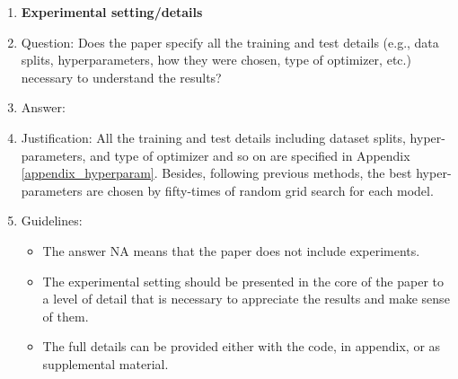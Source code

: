 \documentclass{article}
\begin{document}
\begin{enumerate}
\item {\bf Experimental setting/details}
    \item[] Question: Does the paper specify all the training and test details (e.g., data splits, hyperparameters, how they were chosen, type of optimizer, etc.) necessary to understand the results?
    \item[] Answer: \answerYes{} %
    \item[] Justification: All the training and test details including dataset splits, hyper-parameters, and type of optimizer and so on are specified in Appendix \ref{appendix_hyperparam}. Besides, following previous methods, the best hyper-parameters are chosen by fifty-times of random grid search for each model.
    \item[] Guidelines:
    \begin{itemize}
        \item The answer NA means that the paper does not include experiments.
        \item The experimental setting should be presented in the core of the paper to a level of detail that is necessary to appreciate the results and make sense of them.
        \item The full details can be provided either with the code, in appendix, or as supplemental material.
    \end{itemize}


\end{enumerate}
\end{document}
